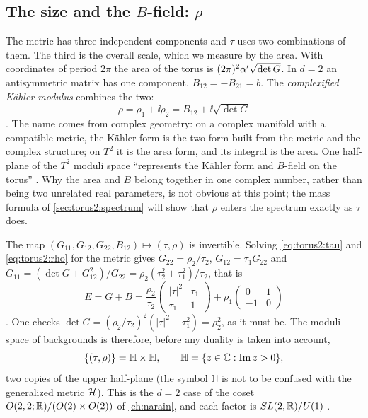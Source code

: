\subsection{The size and the \texorpdfstring{$B$}{B}-field: \texorpdfstring{$\rho$}{rho}}

The metric has three independent components and $\tau$ uses two combinations of them. The
third is the overall scale, which we measure by the area. With coordinates of period $2\pi$
the area of the torus is $(2\pi)^2\alpha'\sqrt{\det G}$. In $d=2$ an antisymmetric matrix has one
component, $B_{12}=-B_{21}=b$. The \emph{complexified K\"ahler
modulus} combines the two:
\begin{equation}\label{eq:torus2:rho}
 \rho=\rho_1+\ii\rho_2=B_{12}+\ii\sqrt{\det G}
\end{equation}
. The name comes from complex geometry:
on a complex manifold with a compatible metric, the K\"ahler form is the two-form built from
the metric and the complex structure; on $T^2$ it is the area form, and its integral is the
area. One half-plane of the $T^2$ moduli space ``represents the K\"ahler form and $B$-field
on the torus'' . Why the area and $B$ belong together in one
complex number, rather than being two unrelated real parameters, is not obvious at this
point; the mass formula of \cref{sec:torus2:spectrum} will show that $\rho$ enters the
spectrum exactly as $\tau$ does.

The map $(G_{11},G_{12},G_{22},B_{12})\mapsto(\tau,\rho)$ is invertible. Solving
\eqref{eq:torus2:tau} and \eqref{eq:torus2:rho} for the metric gives
$G_{22}=\rho_2/\tau_2$, $G_{12}=\tau_1G_{22}$ and $G_{11}=(\det G+G_{12}^2)/G_{22}
=\rho_2(\tau_2^2+\tau_1^2)/\tau_2$, that is
\begin{equation}\label{eq:torus2:E}
 E=G+B=\frac{\rho_2}{\tau_2}\begin{pmatrix}|\tau|^2&\tau_1\\ \tau_1&1\end{pmatrix}
 +\rho_1\begin{pmatrix}0&1\\-1&0\end{pmatrix}
\end{equation}
. One checks
$\det G=(\rho_2/\tau_2)^2(|\tau|^2-\tau_1^2)=\rho_2^2$, as it must be. The moduli space of
backgrounds is therefore, before any duality is taken into account,
\begin{equation}\label{eq:torus2:HxH}
 \{(\tau,\rho)\}=\mathbb H\times\mathbb H,\qquad
 \mathbb H=\{z\in\mathbb{C}:\operatorname{Im}z>0\},
\end{equation}
two copies of the upper half-plane (the symbol $\mathbb H$ is not
to be confused with the generalized metric $\mathcal{H}$). This is the $d=2$ case of the
coset $O(2,2;\mathbb{R})/(O(2)\times O(2))$ of \cref{ch:narain}, and each factor is
$SL(2,\mathbb{R})/U(1)$ .

